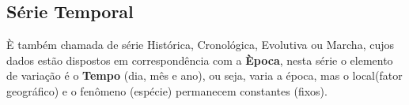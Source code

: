 



\newpage
\subsection{Série Temporal}

È também chamada de série Histórica, Cronológica, Evolutiva ou Marcha, cujos dados estão dispostos em correspondência com a \textbf{Època}, nesta série o elemento de variação é o \textbf{Tempo} (dia, mês e ano), ou seja, varia a época, mas o local(fator geográfico) e o fenômeno (espécie) permanecem constantes (fixos).


